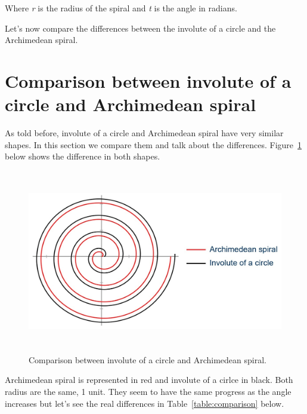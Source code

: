 Where \textit{r} is the radius of the spiral and \textit{t} is the angle in radians.

Let's now compare the differences between the involute of a circle and the Archimedean spiral.

\section{Comparison between involute of a circle and Archimedean spiral}
As told before, involute of a circle and Archimedean spiral have very similar shapes. In this section we compare them and talk about the differences. Figure~\ref{fig:comparison} below shows the difference in both shapes.\newpage
\begin{figure}[h!]
	\centering
	\includegraphics[height=80mm]{chapters/figures/motion_planning/comparison.jpg}
	\caption{Comparison between involute of a circle and Archimedean spiral.}
	\label{fig:comparison}
\end{figure}

Archimedean spiral is represented in red and involute of a cirlce in black. Both radius are the same, 1 unit. They seem to have the same progress as the angle increases but let's see the real differences in Table~\ref{table:comparison} below.

